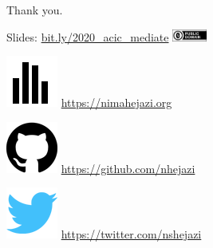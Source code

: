 \documentclass{beamer}
\begin{document}
\begin{frame}[c]{Thank you.}

\large
Slides: \href{http://bit.ly/2020\_acic\_mediate}{bit.ly/2020\_acic\_mediate}
  \quad
\includegraphics[height=4mm]{Figs/cc-zero.png}

\vspace{2mm}
\includegraphics[scale=0.14]{homepage.png} \url{https://nimahejazi.org}

\vspace{2mm}
\includegraphics[scale=0.11]{github-icon.png}
  \url{https://github.com/nhejazi}

\vspace{2mm}
\includegraphics[scale=0.14]{twitter-icon.png}
  \url{https://twitter.com/nshejazi}

\end{frame}




\end{document}
